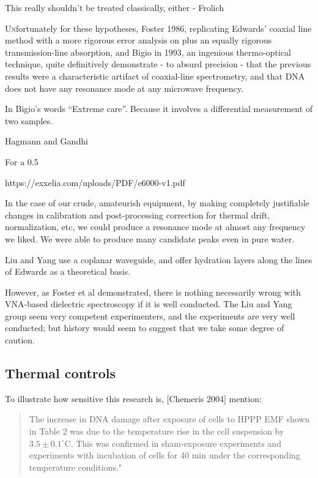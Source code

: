 \documentclass[paper.tex]{subfiles}
\begin{document}
This really shouldn’t be treated classically, either - Frolich 

\lettrine{U}nfortunately for these hypotheses, Foster 1986, replicating Edwards’ coaxial line method with a more rigorous error analysis on plus an equally rigorous transmission-line absorption, and Bigio in 1993, an ingenious thermo-optical technique, quite definitively demonstrate - to absurd precision -  that the previous results were a characteristic artifact of coaxial-line spectrometry, and that DNA does not have any resonance mode at any microwave frequency.

In Bigio’s words “Extreme care”. Because it involves a differential measurement of two samples.

Hagmann and Gandhi \cite{Substitution1982}



For a 0.5%

https://exxelia.com/uploads/PDF/e6000-v1.pdf


In the case of our crude, amateurish equipment, by making completely justifiable changes in calibration and post-processing correction for thermal drift, normalization, etc, we could produce a resonance mode at almost any frequency we liked. We were able to produce many candidate peaks even in pure water.


Liu and Yang use a coplanar waveguide, and offer hydration layers along the lines of Edwards as a theoretical basis.




However, as Foster et al demonstrated, there is nothing necessarily wrong with VNA-based dielectric spectroscopy if it is well conducted. The Liu and Yang group seem very competent experimenters, and the experiments are very well conducted; but history would seem to suggest that we take some degree of caution.




\subsection{Thermal controls}

To illustrate how sensitive this research is, [Chemeris 2004] mention:

\begin{quote}
	
	The increase in DNA damage after exposure of cells to HPPP EMF shown in Table 2 was due to the temperature rise in the cell suspension by $3.5\pm0.1^{\circ}  $C. This was confirmed in sham-exposure experiments and experiments with incubation of cells for 40 min under the corresponding temperature conditions."
	
\end{quote}
\end{document}
